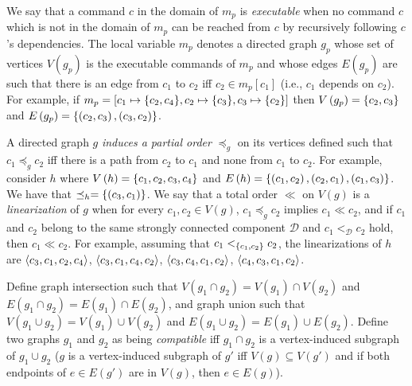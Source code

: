 We say that a command $c$ in the domain of $m_p$ is \emph{executable} when no command $c$ which is not in the domain of $m_p$ can be reached from $c$ by recursively following $c$'s dependencies.
The local variable $m_p$ denotes a directed graph $g_p$ whose set of vertices $V\left( g_p \right)$ is the executable commands of $m_p$ and whose edges $E\left( g_p \right)$ are such that there is an edge from $c_1$ to $c_2$ iff $c_2 \in m_p\left[ c_1 \right]$ (i.e., $c_1$ depends on $c_2$). For example, if $m_p = \left[ c_1 \mapsto \aset{c_2,c_4}, c_2 \mapsto \aset{c_3}, c_3 \mapsto \aset{c_2}\right]$ then $V\left( g_p \right) = \left\{c_2,c_3\right\}$ and $E\left( g_p \right) = \left\{\left( c_2,c_3 \right),\left( c_3,c_2 \right)\right\}$.

A directed graph $g$ \emph{induces a partial order} $\preceq_g$ on its vertices defined such that $c_1 \preceq_g c_2$ iff there is a path from $c_2$ to $c_1$ and none from $c_1$ to $c_2$.
For example, consider $h$ where $V\left( h \right)=\left\{c_1,c_2,c_3,c_4\right\}$ and $E\left( h \right)=\left\{\left( c_1,c_2 \right),\left( c_2,c_1 \right),\left( c_1,c_3 \right)\right\}$. 
We have that $\preceq_h = \left\{\left( c_3,c_1 \right)\right\}$.
We say that a total order $\ll$ on $V\left( g \right)$ is a \emph{linearization} of $g$ when for every $c_1,c_2\in V\left( g \right)$, $c_1 \preceq_g c_2$ implies $c_1 \ll c_2$, and if $c_1$ and $c_2$ belong to the same strongly connected component $\mathcal{D}$ and $ c_1 <_{\mathcal{D}} c_2$ hold, then $c_1 \ll c_2$. For example, assuming that $c_1 <_{\left\{c_1,c_2\right\}} c_2$, the linearizations of $h$ are $\left\langle c_3,c_1,c_2,c_4\right\rangle$, $\left\langle c_3,c_1,c_4,c_2\right\rangle$, $\left\langle c_3,c_4,c_1,c_2\right\rangle$,
$\left\langle c_4,c_3,c_1,c_2\right\rangle$.

\begin{comment}
We now define a partial order on graphs. If $g_1$ and $g_2$ are two graphs, then we write $g_1 \leq g_2$ iff $V\left( g_1 \right)\subseteq V\left( g_2 \right)$, and if $v\in V\left( g_1 \right)$, $e\in E\left( g_2 \right)$, and $v$ is an endpoint of $e$, then $e\in E\left( g_1 \right)$. 
For example, consider the graphs $h'$ and $h''$ such that $V\left( h' \right)=\aset{c_1,c_2,c_4}$, $E\left( h' \right)=\aset{\left( c_1,c_2 \right),\left( c_2,c_1 \right)}$, $V\left( h'' \right)=\aset{c_1,c_3,c_4}$, and $E\left( h'' \right)=\aset{\left( c_1,c_3 \right)}$. We have that $h'\leq h$, but $ h''\not\leq h$.
\end{comment}

Define graph intersection such that $V\left( g_1 \cap g_2 \right)=V\left( g_1 \right)\cap V\left( g_2 \right)$ and $E\left( g_1 \cap g_2 \right)= E\left( g_1 \right)\cap E\left( g_2 \right)$, and graph union such that $V\left( g_1 \cup g_2 \right)=V\left( g_1 \right)\cup V\left( g_2 \right)$ and $E\left( g_1 \cup g_2 \right)= E\left( g_1 \right)\cup E\left( g_2 \right)$.
Define two graphs $g_1$ and $g_2$ as being \emph{compatible} iff $g_1 \cap g_2$ is a vertex-induced subgraph of $g_1 \cup g_2$ ($g$ is a vertex-induced subgraph of $g'$ iff $V\left( g \right)\subseteq V\left( g' \right)$ and if both endpoints of $e\in E\left( g' \right)$ are in $V\left( g \right)$, then $e\in E\left( g \right)$).

